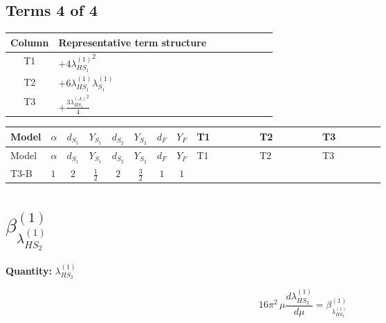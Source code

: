 \documentclass[8pt]{article}
\begin{document}
\begin{landscape}
\subsection*{Terms 4 of 4}
\begin{center}
\begin{tabular}{@{}c >{\raggedright\arraybackslash}p{0.82\linewidth}@{}}
\toprule
Column & Representative term structure \\
\midrule
T1 & \(\displaystyle +4 {\lambda_{HS_1}^{(1)}}^2\) \\
\midrule
T2 & \(\displaystyle +6 {\lambda_{HS_1}^{(1)}} {\lambda_{S_1}^{(1)}}\) \\
\midrule
T3 & \(\displaystyle +\frac{3 {\lambda_{HS_1}^{(A)}}^2}{4}\) \\
\midrule
\bottomrule
\end{tabular}
\end{center}
\smallskip
\tiny
\begin{longtable}{@{}llcccccc >{\raggedright\arraybackslash}p{0.21\linewidth} >{\raggedright\arraybackslash}p{0.21\linewidth} >{\raggedright\arraybackslash}p{0.21\linewidth}@{}}
\toprule
Model & $\alpha$ & $d_{S_1}$ & $Y_{S_1}$ & $d_{S_2}$ & $Y_{S_2}$ & $d_F$ & $Y_F$ & T1 & T2 & T3 \\
\midrule
\endfirsthead
\toprule
Model & $\alpha$ & $d_{S_1}$ & $Y_{S_1}$ & $d_{S_2}$ & $Y_{S_2}$ & $d_F$ & $Y_F$ & T1 & T2 & T3 \\
\midrule
\endhead
T3-B & $1$ & $2$ & $\frac{1}{2}$ & $2$ & $\frac{3}{2}$ & $1$ & $1$ & \scriptsize\adjustbox{max width=\linewidth}{$\begin{gathered} +4 {\lambda_{HS_1}^{(1)}}^2\end{gathered}$} & \scriptsize\adjustbox{max width=\linewidth}{$\begin{gathered} +6 {\lambda_{HS_1}^{(1)}} {\lambda_{S_1}^{(1)}}\end{gathered}$} & \scriptsize\adjustbox{max width=\linewidth}{$\begin{gathered} +\frac{3 {\lambda_{HS_1}^{(A)}}^2}{4}\end{gathered}$} \\
\midrule
\bottomrule
\end{longtable}
\clearpage
\section*{$\beta_{\lambda_{HS_2}^{(1)}}^{(1)}$}
\noindent\textbf{Quantity: }$\lambda_{HS_2}^{(1)}$\par\smallskip
\[16\pi^2\,\mu\frac{d \lambda_{HS_2}^{(1)}}{d\mu}=\beta_{\lambda_{HS_2}^{(1)}}^{(1)}\]

\end{landscape}
\end{document}
